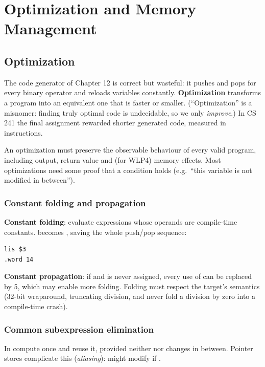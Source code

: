 \chapter{Optimization and Memory Management}

\section{Optimization}

The code generator of Chapter 12 is correct but wasteful: it pushes and pops for every binary
operator and reloads variables constantly. \textbf{Optimization} transforms a program into an
equivalent one that is faster or smaller. (``Optimization'' is a misnomer: finding truly optimal
code is undecidable, so we only \emph{improve}.) In CS 241 the final assignment rewarded
shorter generated code, measured in instructions.

\begin{important}
An optimization must preserve the observable behaviour of every valid program, including
output, return value and (for WLP4) memory effects. Most optimizations need some proof that
a condition holds (e.g.\ ``this variable is not modified in between'').
\end{important}

\subsection{Constant folding and propagation}
\textbf{Constant folding}: evaluate expressions whose operands are compile-time constants.
 becomes , saving the whole push/pop sequence:
\begin{lstlisting}[style=mips]
lis $3
.word 14
\end{lstlisting}
\textbf{Constant propagation}: if  and  is never assigned, every use
of  can be replaced by 5, which may enable more folding. Folding must respect the
target's semantics (32-bit wraparound, truncating division, and never fold a division by zero
into a compile-time crash).

\subsection{Common subexpression elimination}
In  compute  once and reuse it, provided neither 
nor  changes in between. Pointer stores complicate this (\emph{aliasing}): 
might modify  if .

